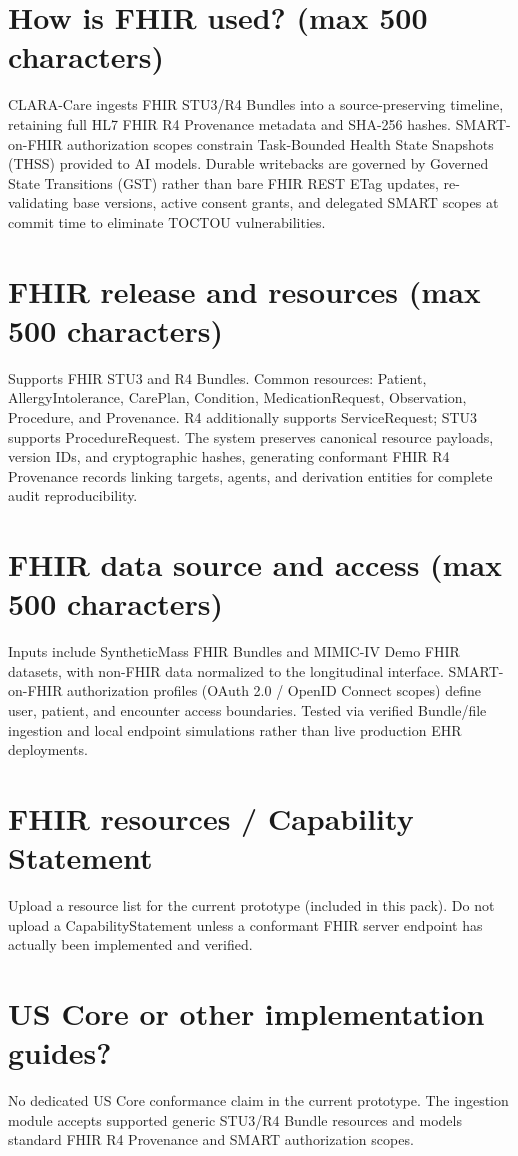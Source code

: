 \documentclass[10pt,letterpaper]{article}
\begin{document}
\section{How is FHIR used? (max 500 characters)}
CLARA-Care ingests FHIR STU3/R4 Bundles into a source-preserving timeline, retaining full HL7 FHIR R4 Provenance metadata and SHA-256 hashes. SMART-on-FHIR authorization scopes constrain Task-Bounded Health State Snapshots (THSS) provided to AI models. Durable writebacks are governed by Governed State Transitions (GST) rather than bare FHIR REST ETag updates, re-validating base versions, active consent grants, and delegated SMART scopes at commit time to eliminate TOCTOU vulnerabilities.

\section{FHIR release and resources (max 500 characters)}
Supports FHIR STU3 and R4 Bundles. Common resources: Patient, AllergyIntolerance, CarePlan, Condition, MedicationRequest, Observation, Procedure, and Provenance. R4 additionally supports ServiceRequest; STU3 supports ProcedureRequest. The system preserves canonical resource payloads, version IDs, and cryptographic hashes, generating conformant FHIR R4 Provenance records linking targets, agents, and derivation entities for complete audit reproducibility.

\section{FHIR data source and access (max 500 characters)}
Inputs include SyntheticMass FHIR Bundles and MIMIC-IV Demo FHIR datasets, with non-FHIR data normalized to the longitudinal interface. SMART-on-FHIR authorization profiles (OAuth 2.0 / OpenID Connect scopes) define user, patient, and encounter access boundaries. Tested via verified Bundle/file ingestion and local endpoint simulations rather than live production EHR deployments.

\section{FHIR resources / Capability Statement}
Upload a resource list for the current prototype (included in this pack). Do not upload a CapabilityStatement unless a conformant FHIR server endpoint has actually been implemented and verified.

\section{US Core or other implementation guides?}
No dedicated US Core conformance claim in the current prototype. The ingestion module accepts supported generic STU3/R4 Bundle resources and models standard FHIR R4 Provenance and SMART authorization scopes.
\end{document}
